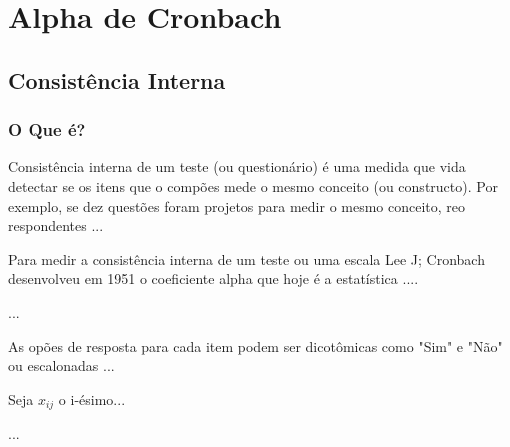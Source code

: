 \section{Alpha de Cronbach \cite{torres}}

	\subsection{Consistência Interna}
	
	    \subsubsection{O Que é?}
	
	        Consistência interna de um teste (ou questionário) é uma medida que vida detectar se os itens que o compões mede o mesmo conceito (ou constructo). Por exemplo, se dez questões foram projetos para medir o mesmo conceito, reo respondentes ...
	        
	        Para medir a consistência interna de um teste ou uma escala Lee J; Cronbach desenvolveu em 1951 o coeficiente alpha que hoje é a estatística ....
	        
	        ...
	        
	        As opões de resposta para cada item podem ser dicotômicas como "Sim" e "Não" ou escalonadas ...
	        
	        Seja $x_{ij}$ o i-ésimo...
	        
	        ...
	        
        \subsection{}
	

        